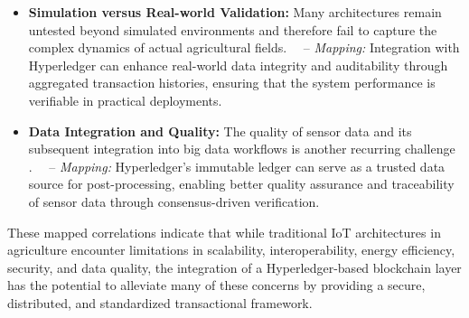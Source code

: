 \documentclass[12pt,onecolumn]{IEEEtran} %
\begin{document}
\begin{itemize}
\item \textbf{Simulation versus Real-world Validation:} Many architectures remain untested beyond simulated environments \cite{bayih2022utilizationofinternet, atalla2023iotenabledprecisionagriculture} and therefore fail to capture the complex dynamics of actual agricultural fields.  
 – \textit{Mapping:} Integration with Hyperledger can enhance real-world data integrity and auditability through aggregated transaction histories, ensuring that the system performance is verifiable in practical deployments.

\item \textbf{Data Integration and Quality:} The quality of sensor data and its subsequent integration into big data workflows is another recurring challenge \cite{ouafiq2022datamanagementand, ouafiq2022datamanagementand}.  
 – \textit{Mapping:} Hyperledger’s immutable ledger can serve as a trusted data source for post-processing, enabling better quality assurance and traceability of sensor data through consensus-driven verification.
\end{itemize}

These mapped correlations indicate that while traditional IoT architectures in agriculture encounter limitations in scalability, interoperability, energy efficiency, security, and data quality, the integration of a Hyperledger-based blockchain layer has the potential to alleviate many of these concerns by providing a secure, distributed, and standardized transactional framework.
\end{document}
